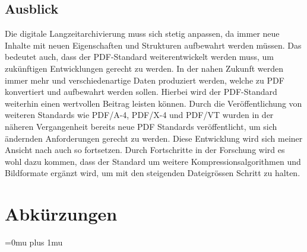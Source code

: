 \documentclass[a4paper,oneside, 12pt]{report}
\begin{document}
\section{Ausblick}
Die digitale Langzeitarchivierung muss sich stetig anpassen, da immer neue Inhalte mit neuen Eigenschaften und Strukturen aufbewahrt werden müssen. Das bedeutet auch, dass der PDF-Standard weiterentwickelt werden muss, um zukünftigen Entwicklungen gerecht zu werden. In der nahen Zukunft werden immer mehr und verschiedenartige Daten produziert werden, welche zu PDF konvertiert und aufbewahrt werden sollen. Hierbei wird der PDF-Standard weiterhin einen wertvollen Beitrag leisten können. Durch die Veröffentlichung von weiteren Standards wie PDF/A-4, PDF/X-4 und PDF/VT wurden in der näheren Vergangenheit bereits neue PDF Standards veröffentlicht, um sich ändernden Anforderungen gerecht zu werden. Diese Entwicklung wird sich meiner Ansicht nach auch so fortsetzen. Durch Fortschritte in der Forschung wird es wohl dazu kommen, dass der Standard um weitere Kompressionsalgorithmen und Bildformate ergänzt wird, um mit den steigenden Dateigrössen Schritt zu halten.


\cleardoublepage
{}
{}
\chapter*{Abkürzungen}
\begin{acronym}[Abkürzungen]
\end{acronym}

\cleardoublepage
{}
{}
\Urlmuskip=0mu plus 1mu\relax
\end{document}
